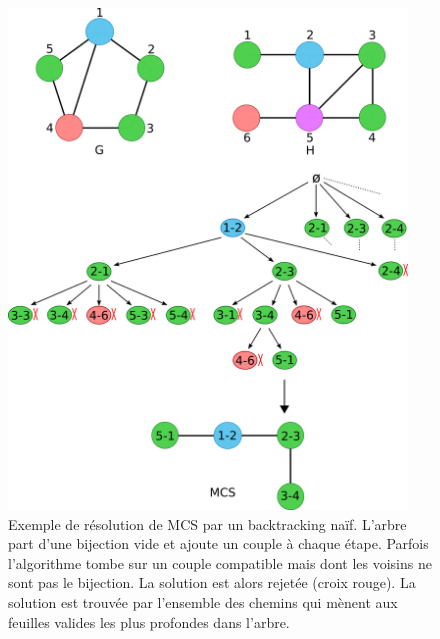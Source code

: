 \documentclass[12pt,french,twoside]{report}
\begin{document}
\begin{figure}[!ht]
  \begin{center}
    \includegraphics[width=400px]{Figures/s2m/MCS-SI/backtracking_solve.png}
    \caption{\label{backtracking_solve}Exemple de résolution de MCS par un backtracking naïf.
    L'arbre part d'une bijection vide et ajoute un couple à chaque étape.
    Parfois l'algorithme tombe sur un couple compatible mais dont les voisins ne sont pas le bijection.
    La solution est alors rejetée (croix rouge).
    La solution est trouvée par l'ensemble des chemins qui mènent aux feuilles valides les plus profondes dans l'arbre.}
  \end{center}
\end{figure}
\end{document}
